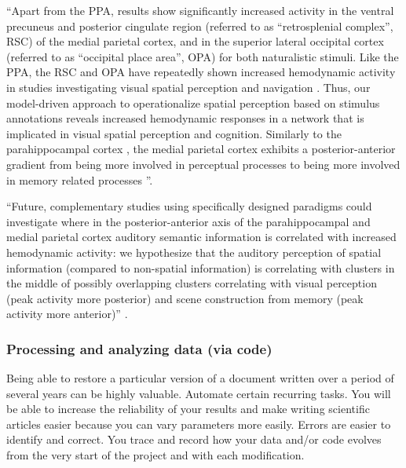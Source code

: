 
``Apart from the PPA, results show significantly increased activity in the
ventral precuneus and posterior cingulate region (referred to as ``retrosplenial
complex'', RSC) of the medial parietal cortex, and in the superior lateral
occipital cortex (referred to as ``occipital place area'', OPA) for both
naturalistic stimuli.
Like the PPA, the RSC and OPA have repeatedly shown increased hemodynamic
activity in studies investigating visual spatial perception and navigation
\citep{chrastil2018heterogeneity, bettencourt2013role, dilks2013occipital,
epstein2019scene}.
Thus, our model-driven approach to operationalize spatial perception based on
stimulus annotations reveals increased hemodynamic responses in a network that
is implicated in visual spatial perception and cognition.
Similarly to the parahippocampal cortex \citep{aminoff2013role}, the medial
parietal cortex exhibits a posterior-anterior gradient from being more involved
in perceptual processes to being more involved in memory related processes
\citep{chrastil2018heterogeneity, hassabis2009construction, silson2019posterior,
steel2021network}''.

``Future, complementary studies using specifically designed paradigms could
investigate where in the posterior-anterior axis of the parahippocampal and
medial parietal cortex auditory semantic information is correlated with
increased hemodynamic activity:
we hypothesize that the auditory perception of spatial information (compared to
non-spatial information) is correlating with clusters in the middle of possibly
overlapping clusters correlating with visual perception (peak activity more
posterior) and scene construction from memory (peak activity more anterior)''
\citep{haeusler2022processing}.



\subsubsection{Processing and analyzing data (via code)}

%
Being able to restore a particular version of a document written over a period
of several years can be highly valuable.
%
Automate certain recurring tasks.
%
You will be able to increase the reliability of your results and make writing
scientific articles easier because you can vary parameters more easily.
%
Errors are easier to identify and correct. You trace and record how your data
and/or code evolves from the very start of the project and with each
modification.



